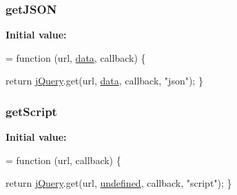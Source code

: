 \subsubsection[{\texorpdfstring{get\+J\+S\+ON}{getJSON}}]{ get\+J\+S\+ON}\hypertarget{jquery-2_82_81-vsdoc_8js_a27b6f13a844bac0871a73628443197b5}{}\label{jquery-2_82_81-vsdoc_8js_a27b6f13a844bac0871a73628443197b5}
{\bfseries Initial value\+:}
\begin{DoxyCode}
= \textcolor{keyword}{function} (url, \hyperlink{jquery-2_82_81-vsdoc_8js_a609407b3456fdc3c5671a9fc4a226ff7}{data}, callback) \{
        

        \textcolor{keywordflow}{return} \hyperlink{jquery-2_82_81-vsdoc_8js_add5237586d970a38a81f990e8eb28c6c}{jQuery}.get(url, \hyperlink{jquery-2_82_81-vsdoc_8js_a609407b3456fdc3c5671a9fc4a226ff7}{data}, callback, \textcolor{stringliteral}{"json"});
    \}
\end{DoxyCode}
\subsubsection[{\texorpdfstring{get\+Script}{getScript}}]{ get\+Script}\hypertarget{jquery-2_82_81-vsdoc_8js_abbf3713d0b4ae50a921583a6932e4c71}{}\label{jquery-2_82_81-vsdoc_8js_abbf3713d0b4ae50a921583a6932e4c71}
{\bfseries Initial value\+:}
\begin{DoxyCode}
= \textcolor{keyword}{function} (url, callback) \{
        

        \textcolor{keywordflow}{return} \hyperlink{jquery-2_82_81-vsdoc_8js_add5237586d970a38a81f990e8eb28c6c}{jQuery}.get(url, \hyperlink{jquery-2_82_81-vsdoc_8js_a08113a236cc18d2a9d5ce27e638012be}{undefined}, callback, \textcolor{stringliteral}{"script"});
    \}
\end{DoxyCode}
